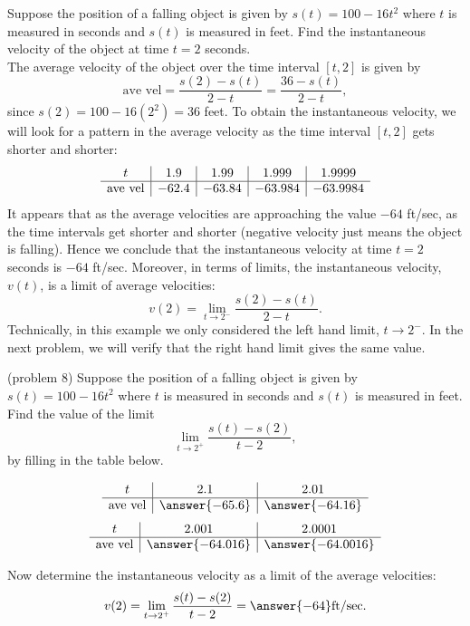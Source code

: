 \documentclass[handout]{ximera}
\begin{document}
\begin{example}[example 8]
Suppose the position of a falling object is given by $s(t) = 100-16t^2$ where $t$ is measured in seconds and $s(t)$ is measured in feet.
Find the instantaneous velocity of the object at time $t = 2$ seconds.\\
The average velocity of the object over the time interval $[t,2]$ is given by 
\[
\text{ave vel} = \frac{s(2)-s(t)}{2-t} = \frac{36-s(t)}{2-t},
\]
since $s(2) = 100 - 16(2^2) = 36$ feet.
To obtain the instantaneous velocity, we will look for a pattern in the average velocity as the time interval $[t, 2]$ gets shorter and shorter:
\[
\begin{array}{ c | c | c | c | c }
 t & 1.9 & 1.99  & 1.999 & 1.9999 \\ 
	\hline 
	 \text{ave vel} & -62.4 & -63.84 & -63.984 & -63.9984
\end{array}
\]  
It appears that as the average velocities are approaching the value $-64$ ft/sec, as the time intervals 
get shorter and shorter (negative velocity just means the object is falling).  Hence we conclude that the instantaneous velocity at time $t = 2$ seconds is $-64$ ft/sec.
Moreover, in terms of limits, the instantaneous velocity, $v(t)$, is a limit of average velocities:
\[
v(2) = \lim_{t\to 2^-} \frac{s(2) - s(t)}{2-t}.
\]
Technically, in this example we only considered the left hand limit, $t\to 2^-$.
In the next problem, we will verify that the right hand limit gives the same value. 
\end{example}

\begin{problem}(problem 8)
Suppose the position of a falling object is given by $s(t) = 100-16t^2$ where $t$ is measured in seconds and $s(t)$ is measured in feet.
Find the value of the limit
\[
\lim_{t\to 2^+} \frac{s(t) - s(2)}{t-2},
\]
by filling in the table below.

\begin{center}
\[
\begin{array}{ c | c | c }
  t & 2.1 & 2.01   \\ 
	\hline 
	 \text{ave vel} & \answer{-65.6} & \answer{-64.16} 
\end{array}
\]
\[
\begin{array}{ c | c | c  }
  t  & 2.001 & 2.0001 \\ 
	\hline 
	 \text{ave vel} & \answer{-64.016} & \answer{-64.0016}
\end{array}
\]
\end{center}
Now determine the instantaneous velocity as a limit of the average velocities:
\[
v(2) = \lim_{t\to 2^+} \frac{s(t) - s(2)}{t-2} = \answer{-64} \text{ft/sec}.
\]



\end{problem}


\begin{center}
\begin{foldable}
\end{foldable}
\end{center}
\end{document}
